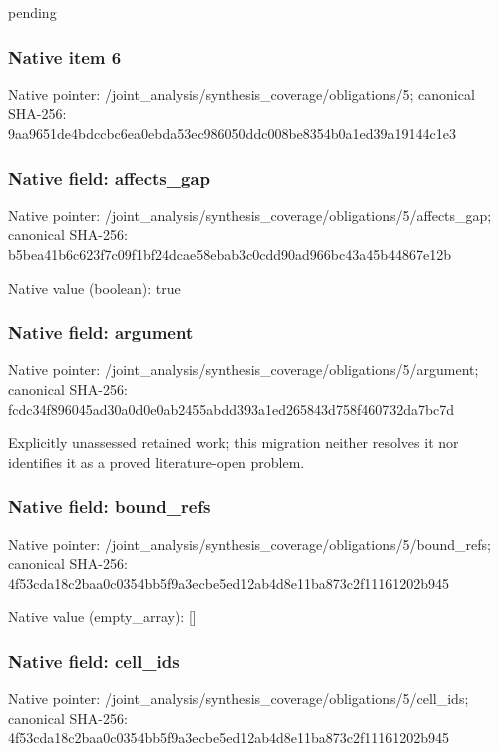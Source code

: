 \documentclass[10pt,a4paper]{article}
\begin{document}
\begingroup\raggedright\sloppy pending\par\endgroup

\subsubsection{Native item 6}
Native pointer: /joint\_\allowbreak{}analysis/synthesis\_\allowbreak{}coverage/obligations/5; canonical SHA-256: 9aa9651de4bdccbc6ea0ebda53ec986050ddc008be8354b0a1ed39a19144c1e3

\subsubsection{Native field: affects\_\allowbreak{}gap}
Native pointer: /joint\_\allowbreak{}analysis/synthesis\_\allowbreak{}coverage/obligations/5/affects\_\allowbreak{}gap; canonical SHA-256: b5bea41b6c623f7c09f1bf24dcae58ebab3c0cdd90ad966bc43a45b44867e12b

Native value (boolean): true

\subsubsection{Native field: argument}
Native pointer: /joint\_\allowbreak{}analysis/synthesis\_\allowbreak{}coverage/obligations/5/argument; canonical SHA-256: fcdc34f896045ad30a0d0e0ab2455abdd393a1ed265843d758f460732da7bc7d

\begingroup\raggedright\sloppy Explicitly unassessed retained work;\allowbreak{} this migration neither resolves it nor identifies it as a proved literature-open problem.\par\endgroup

\subsubsection{Native field: bound\_\allowbreak{}refs}
Native pointer: /joint\_\allowbreak{}analysis/synthesis\_\allowbreak{}coverage/obligations/5/bound\_\allowbreak{}refs; canonical SHA-256: 4f53cda18c2baa0c0354bb5f9a3ecbe5ed12ab4d8e11ba873c2f11161202b945

Native value (empty\_\allowbreak{}array): []

\subsubsection{Native field: cell\_\allowbreak{}ids}
Native pointer: /joint\_\allowbreak{}analysis/synthesis\_\allowbreak{}coverage/obligations/5/cell\_\allowbreak{}ids; canonical SHA-256: 4f53cda18c2baa0c0354bb5f9a3ecbe5ed12ab4d8e11ba873c2f11161202b945
\end{document}
